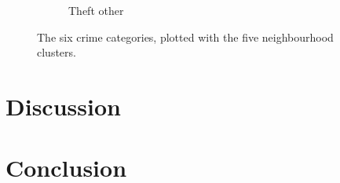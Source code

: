 \documentclass{article}
\begin{document}
\begin{figure}[ht]
\begin{subfigure}[b]{0.47\textwidth}
         \caption{Theft other}
     \end{subfigure}
        \caption{The six crime categories, plotted with the five neighbourhood clusters.}
        \label{fig:nbhcrime}
\end{figure}

\section{Discussion}

\section{Conclusion}
 
\end{document}
